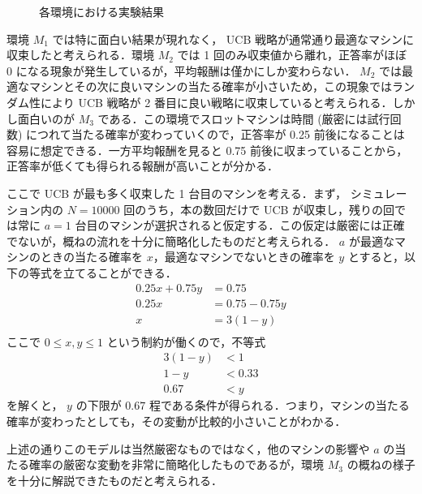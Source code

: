 \documentclass{jsarticle}
\newlength{\figwidth}
\begin{document}
\begin{figure}[H]
\centering
{}
\caption{各環境における実験結果}\label{fig:hk1}
\end{figure}

環境 $M_1$ では特に面白い結果が現れなく， UCB 戦略が通常通り最適なマシンに収束したと考えられる．環境 $M_2$ では 1 回のみ収束値から離れ，正答率がほぼ 0 になる現象が発生しているが，平均報酬は僅かにしか変わらない． $M_2$ では最適なマシンとその次に良いマシンの当たる確率が小さいため，この現象ではランダム性により UCB 戦略が 2 番目に良い戦略に収束していると考えられる．しかし面白いのが $M_3$ である．この環境でスロットマシンは時間 (厳密には試行回数) につれて当たる確率が変わっていくので，正答率が 0.25 前後になることは容易に想定できる．一方平均報酬を見ると 0.75 前後に収まっていることから，正答率が低くても得られる報酬が高いことが分かる．

ここで UCB が最も多く収束した 1 台目のマシンを考える．まず， シミュレーション内の $N = 10000$ 回のうち，本の数回だけで UCB が収束し，残りの回では常に $ a = 1 $ 台目のマシンが選択されると仮定する．この仮定は厳密には正確でないが，概ねの流れを十分に簡略化したものだと考えられる． $a$ が最適なマシンのときの当たる確率を $x$，最適なマシンでないときの確率を $y$ とすると，以下の等式を立てることができる．
\begin{align}
  0.25x + 0.75y &= 0.75 \\
  0.25x &= 0.75 - 0.75y \\
  x &= 3(1 - y) \\
\end{align}
ここで $0 \leq x, y \leq 1$ という制約が働くので，不等式
\begin{align}
  3(1 - y) &< 1 \\
  1 - y &< 0.33 \\
  0.67 &< y
\end{align}
を解くと， $y$ の下限が $0.67$ 程である条件が得られる．つまり，マシンの当たる確率が変わったとしても，その変動が比較的小さいことがわかる．

上述の通りこのモデルは当然厳密なものではなく，他のマシンの影響や $a$ の当たる確率の厳密な変動を非常に簡略化したものであるが，環境 $M_3$ の概ねの様子を十分に解説できたものだと考えられる．
\end{document}
